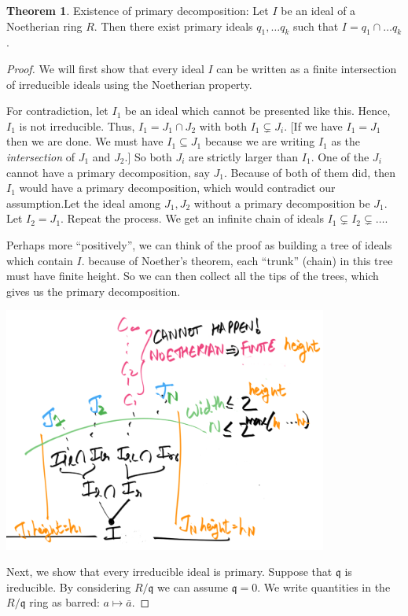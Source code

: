 \documentclass{book}
\newcommand{\q}{\mathfrak{q}}
\theoremstyle{definition}
\newtheorem{theorem}{Theorem}
\begin{document}
\begin{theorem}Existence of primary decomposition: Let $I$ be an ideal
of a Noetherian ring $R$. Then there exist primary ideals $q_1, \dots q_k$
such that $I = q_1 \cap \dots q_k$.
\end{theorem}
\begin{proof}
We will first show that every ideal $I$ can be written as a finite intersection
of irreducible ideals using the Noetherian property.

For contradiction, let $I_1$ be an ideal which cannot be presented like this. 
Hence, $I_1$ is not irreducible. Thus, $I_1 = J_1 \cap J_2$ with both $I_1 \subsetneq J_i$.
[If we have $I_1 = J_1$ then we are done. We must have $I_1 \subseteq J_1$
because we are writing $I_1$ as the \emph{intersection} of $J_1$ and $J_2$.]
So both $J_i$ are strictly larger than $I_1$. One of the $J_i$ cannot
have a primary decomposition, say $J_1$. Because of both of them did, 
then $I_1$ would have a primary decomposition, which would contradict
our assumption.Let the ideal among $J_1, J_2$
without a primary decomposition be $J_1$.  Let $I_2 = J_1$. Repeat the process.
We get an infinite chain of ideals $I_1 \subsetneq I_2 \subsetneq \dots$.


Perhaps more ``positively'', we can think of the proof as building
a tree of ideals which contain $I$. because of Noether's theorem,
each ``trunk'' (chain) in this tree must have finite height. So we can
then collect all the tips of the trees, which gives us the primary 
decomposition.

\includegraphics[width=0.8\textwidth]{noetherian-primary-decomposition.png}

Next, we show that every irreducible ideal is primary.
Suppose that $\q$ is ireducible. By considering $R/\q$ we can assume $\q = 0$.
We write quantities in the $R/\q$ ring as barred: $a \mapsto \bar{a}$. 



\end{proof}
\end{document}
